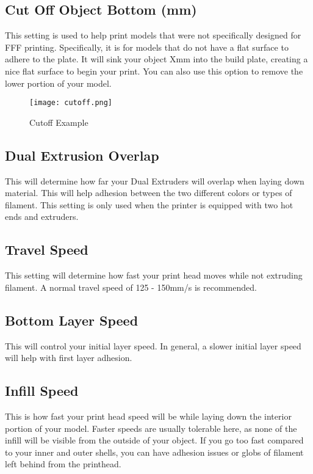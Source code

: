 \subsection{Cut Off Object Bottom (mm)}
This setting is used to help print models that were not specifically designed for FFF printing. Specifically, it is for models that do not have a flat surface to adhere to the plate. It will sink your object Xmm into the build plate, creating a nice flat surface to begin your print. You can also use this option to remove the lower portion of your model.
\begin{figure}[H]
\centering
\texttt{[image: cutoff.png]}
\caption{Cutoff Example}
\label{fig:Cutoff Example}
\end{figure}

\subsection{Dual Extrusion Overlap}
This will determine how far your Dual Extruders will overlap when laying down material. This will help adhesion between the two different colors or types of filament. This setting is only used when the printer is equipped with two hot ends and extruders.

\subsection{Travel Speed}
This setting will determine how fast your print head moves while not extruding filament. A normal travel speed of 125 - 150mm/s is recommended.

\subsection{Bottom Layer Speed}
This will control your initial layer speed. In general, a slower initial layer speed will help with first layer adhesion. 

\subsection{Infill Speed}
This is how fast your print head speed will be while laying down the interior portion of your model. Faster speeds are usually tolerable here, as none of the infill will be visible from the outside of your object. If you go too fast compared to your inner and outer shells, you can have adhesion issues or globs of filament left behind from the printhead.

